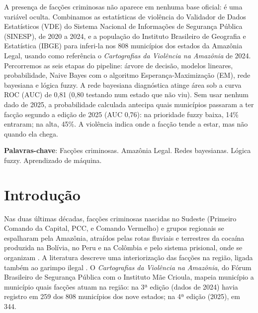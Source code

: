 \documentclass[article,12pt,oneside,a4paper,brazil,sumario=tradicional]{abntex2}
\begin{document}
\frenchspacing

\maketitle

\begin{resumoumacoluna}
A presença de facções criminosas não aparece em nenhuma base oficial: é uma variável oculta.
Combinamos as estatísticas de violência do Validador de Dados Estatísticos (VDE) do Sistema
Nacional de Informações de Segurança Pública (SINESP), de 2020 a 2024, e a população do
Instituto Brasileiro de Geografia e Estatística (IBGE) para inferi-la nos 808 municípios dos
estados da Amazônia Legal, usando como referência o \emph{Cartografias da Violência na
Amazônia} de 2024. Percorremos as seis etapas do pipeline: árvore de decisão, modelos
lineares, probabilidade, Naive Bayes com o algoritmo Esperança-Maximização (EM), rede
bayesiana e lógica fuzzy. A rede bayesiana diagnóstica atinge área sob a curva ROC (AUC) de
0,81 (0,80 testando num estado que não viu). Sem usar nenhum dado de 2025, a probabilidade calculada antecipa
quais municípios passaram a ter facção segundo a edição de 2025 (AUC 0,76): na prioridade
fuzzy baixa, 14\% entraram; na alta, 45\%. A violência indica onde a facção tende a estar,
mas não quando ela chega.

\vspace{\onelineskip}
\noindent\textbf{Palavras-chave}: Facções criminosas. Amazônia Legal. Redes bayesianas.
Lógica fuzzy. Aprendizado de máquina.
\end{resumoumacoluna}

\textual

\section{Introdução}

Nas duas últimas décadas, facções criminosas nascidas no Sudeste (Primeiro Comando da
Capital, PCC, e Comando Vermelho)
e grupos regionais se espalharam pela Amazônia, atraídos pelas rotas fluviais e terrestres
da cocaína produzida na Bolívia, no Peru e na Colômbia \cite{r11} e pelo sistema prisional,
onde se organizam \cite{r10}. A literatura descreve uma interiorização das facções na
região, ligada também ao garimpo ilegal \cite{r12,r13}. O \emph{Cartografias da Violência
na Amazônia}, do Fórum Brasileiro de Segurança Pública com o Instituto Mãe Crioula, mapeia
município a município quais facções atuam na região: na 3ª edição (dados de 2024) havia
registro em 259 dos 808 municípios dos nove estados; na 4ª edição (2025), em 344.
\end{document}
